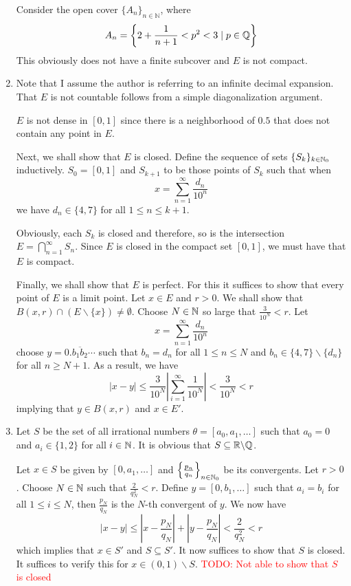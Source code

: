 \begin{enumerate}
Consider the open cover $\{A_n\}_{n\in\mathbb{N}}$, where 
\begin{equation*}
    A_n = \left\{2 + \frac{1}{n + 1} < p^2 < 3\mid p\in\mathbb{Q}\right\}
\end{equation*}
This obviously does not have a finite subcover and $E$ is not compact.

\item Note that I assume the author is referring to an infinite decimal expansion. That $E$ is not countable follows from a simple diagonalization argument. 

$E$ is not dense in $[0,1]$ since there is a neighborhood of $0.5$ that does not contain any point in $E$.

Next, we shall show that $E$ is closed. Define the sequence of sets $\{S_k\}_{k\in\mathbb{N}_0}$ inductively. $S_0 = [0,1]$ and $S_{k + 1}$ to be those points of $S_k$ such that when 
\begin{equation*}
    x = \sum_{n = 1}^\infty\frac{d_n}{10^n}
\end{equation*}
we have $d_n\in\{4,7\}$ for all $1\le n\le k + 1$.

Obviously, each $S_k$ is closed and therefore, so is the intersection $E = \bigcap_{n = 1}^\infty S_n$. Since $E$ is closed in the compact set $[0,1]$, we must have that $E$ is compact.

Finally, we shall show that $E$ is perfect. For this it suffices to show that every point of $E$ is a limit point. Let $x\in E$ and $r > 0$. We shall show that $B(x,r)\cap(E\backslash\{x\})\ne\emptyset$. Choose $N\in\mathbb{N}$ so large that $\frac{3}{10^N} < r$. Let
\begin{equation*}
    x = \sum_{n = 1}^\infty\frac{d_n}{10^n}
\end{equation*}
choose $y = \overline{0.b_1b_2\cdots}$ such that $b_n = d_n$ for all $1\le n\le N$ and $b_n\in\{4,7\}\backslash\{d_n\}$ for all $n\ge N + 1$. As a result, we have 
\begin{equation*}
    |x - y|\le\frac{3}{10^N}\left|\sum_{i = 1}^\infty\frac{1}{10^N}\right| < \frac{3}{10^N} < r
\end{equation*}
implying that $y\in B(x,r)$ and $x\in E'$.

\item Let $S$ be the set of all irrational numbers $\theta = [a_0,a_1,\ldots]$ such that $a_0 = 0$ and $a_i\in\{1,2\}$ for all $i\in\mathbb{N}$. It is obvious that $S\subseteq\mathbb{R}\backslash\mathbb{Q}$.

Let $x\in S$ be given by $[0,a_1,\ldots]$ and $\left\{\frac{p_n}{q_n}\right\}_{n\in\mathbb{N}_0}$ be its convergents. Let $r > 0$. Choose $N\in\mathbb{N}$ such that $\frac{2}{q_N^2} < r$. Define $y = [0,b_1,\ldots]$ such that $a_i = b_i$ for all $1\le i\le N$, then $\frac{p_N}{q_N}$ is the $N$-th convergent of $y$. We now have 
\begin{equation*}
    |x - y|\le\left|x - \frac{p_N}{q_N}\right| + \left|y - \frac{p_N}{q_N}\right| < \frac{2}{q_N^2} < r
\end{equation*}
which implies that $x\in S'$ and $S\subseteq S'$. It now suffices to show that $S$ is closed. It suffices to verify this for $x\in(0,1)\backslash S$. \textcolor{red}{TODO: Not able to show that $S$ is closed} 


\end{enumerate}
